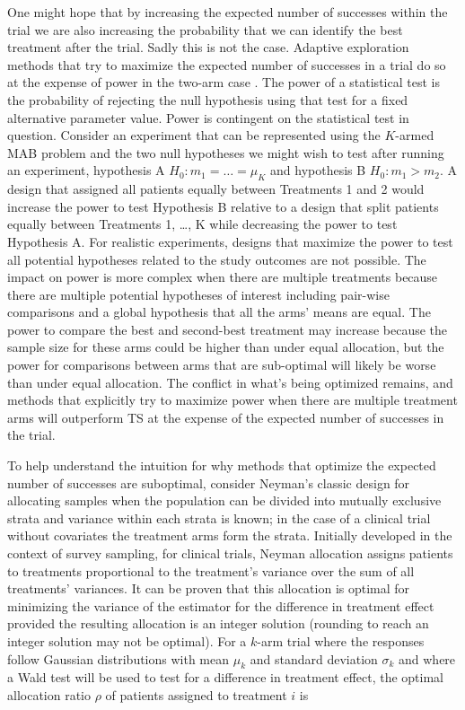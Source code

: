 \documentclass[12pt,,letterpaper,twoside]{report}
\begin{document}
One might hope that by increasing the expected number of successes
within the trial we are also increasing the probability that we can
identify the best treatment after the trial. Sadly this is not the case.
Adaptive exploration methods that try to maximize the expected number of
successes in a trial do so at the expense of power in the two-arm case
\citep{bubeck2009pure, wathen2017simulation}. The power of a statistical
test is the probability of rejecting the null hypothesis using that test
for a fixed alternative parameter value. Power is contingent on the
statistical test in question. Consider an experiment that can be
represented using the \(K\)-armed MAB problem and the two null
hypotheses we might wish to test after running an experiment, hypothesis
A \(H_0: m_1 = \ldots = \mu_K\) and hypothesis B \(H_0: m_1 > m_2\). A
design that assigned all patients equally between Treatments 1 and 2
would increase the power to test Hypothesis B relative to a design that
split patients equally between Treatments 1, \ldots, K while decreasing
the power to test Hypothesis A. For realistic experiments, designs that
maximize the power to test all potential hypotheses related to the study
outcomes are not possible. The impact on power is more complex when
there are multiple treatments because there are multiple potential
hypotheses of interest including pair-wise comparisons and a global
hypothesis that all the arms' means are equal. The power to compare the
best and second-best treatment may increase because the sample size for
these arms could be higher than under equal allocation, but the power
for comparisons between arms that are sub-optimal will likely be worse
than under equal allocation. The conflict in what's being optimized
remains, and methods that explicitly try to maximize power when there
are multiple treatment arms will outperform TS at the expense of the
expected number of successes in the trial.

To help understand the intuition for why methods that optimize the
expected number of successes are suboptimal, consider Neyman's classic
design for allocating samples when the population can be divided into
mutually exclusive strata and variance within each strata is known; in
the case of a clinical trial without covariates the treatment arms form
the strata. Initially developed in the context of survey sampling, for
clinical trials, Neyman allocation \cite{neyman1934aspects} assigns
patients to treatments proportional to the treatment's variance over the
sum of all treatments' variances. It can be proven that this allocation
is optimal for minimizing the variance of the estimator for the
difference in treatment effect provided the resulting allocation is an
integer solution (rounding to reach an integer solution may not be
optimal). For a \(k\)-arm trial where the responses follow Gaussian
distributions with mean \(\mu_k\) and standard deviation \(\sigma_k\)
and where a Wald test will be used to test for a difference in treatment
effect, the optimal allocation ratio \(\rho\) of patients assigned to
treatment \(i\) is
\end{document}
